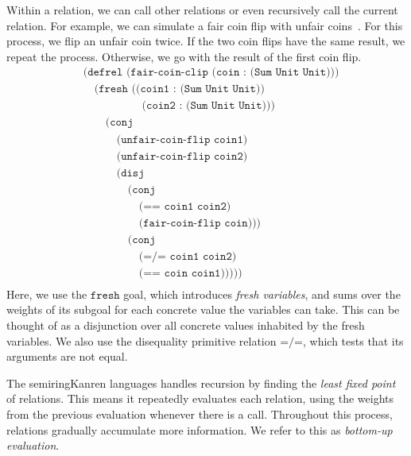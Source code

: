 \documentclass{report}
\theoremstyle{definition}
\begin{document}
Within a relation, we can call other relations or even recursively call the current relation.
For example, we can simulate a fair coin flip with unfair coins~\cite{vonneumann1963}.
For this process, we flip an unfair coin twice.
If the two coin flips have the same result, we repeat the process.
Otherwise, we go with the result of the first coin flip.
\begin{equation}
\begin{aligned}
	& \texttt{(defrel (fair-coin-clip (coin : (Sum Unit Unit)))} \\
	& \quad \texttt{(fresh ((coin1 : (Sum Unit Unit))} \\
	& \quad\quad\quad\quad\quad\; \texttt{(coin2 : (Sum Unit Unit)))} \\
	& \quad\quad \texttt{(conj} \\
	& \quad\quad\quad \texttt{(unfair-coin-flip coin1)} \\
	& \quad\quad\quad \texttt{(unfair-coin-flip coin2)} \\
	& \quad\quad\quad \texttt{(disj} \\
	& \quad\quad\quad\quad \texttt{(conj} \\
	& \quad\quad\quad\quad\quad \texttt{(== coin1 coin2)} \\
	& \quad\quad\quad\quad\quad \texttt{(fair-coin-flip coin)))} \\
	& \quad\quad\quad\quad \texttt{(conj} \\
	& \quad\quad\quad\quad\quad \texttt{(=/= coin1 coin2)} \\
	& \quad\quad\quad\quad\quad \texttt{(== coin coin1)))))} \\
\end{aligned}
\end{equation}
Here, we use the \(\texttt{fresh}\) goal, which introduces \emph{fresh variables}, and sums over the weights of its subgoal for each concrete value the variables can take.
This can be thought of as a disjunction over all concrete values inhabited by the fresh variables.
We also use the disequality primitive relation \(\texttt{=/=}\), which tests that its arguments are not equal.

The semiringKanren languages handles recursion by finding the \emph{least fixed point} of relations.
This means it repeatedly evaluates each relation, using the weights from the previous evaluation whenever there is a call.
Throughout this process, relations gradually accumulate more information.
We refer to this as \emph{bottom-up evaluation}.
\end{document}

